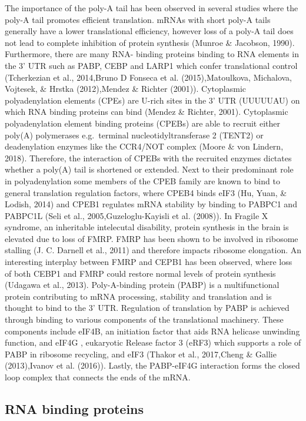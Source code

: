 \documentclass[12pt,openany]{book}
\begin{document}
The importance of the poly-A tail has been observed in several studies
where the poly-A tail promotes efficient translation. mRNAs with short
poly-A tails generally have a lower translational efficiency, however
loss of a poly-A tail does not lead to complete inhibition of protein
synthesis (Munroe \& Jacobson, 1990). Furthermore, there are many RNA-
binding proteins binding to RNA elements in the 3' UTR such as PABP,
CEBP and LARP1 which confer translational control (Tcherkezian et al.,
2014,Bruno D Fonseca et al. (2015),Matoulkova, Michalova, Vojtesek, \&
Hrstka (2012),Mendez \& Richter (2001)). Cytoplasmic polyadenylation
elements (CPEs) are U-rich sites in the 3' UTR (UUUUUAU) on which RNA
binding proteins can bind (Mendez \& Richter, 2001). Cytoplasmic
polyadenylation element binding proteins (CPEBs) are able to recruit
either poly(A) polymerases e.g.~terminal nucleotidyltransferase 2
(TENT2) or deadenylation enzymes like the CCR4/NOT complex (Moore \& von
Lindern, 2018). Therefore, the interaction of CPEBs with the recruited
enzymes dictates whether a poly(A) tail is shortened or extended. Next
to their predominant role in polyadenylation some members of the CPEB
family are known to bind to general translation regulation factors,
where CPEB4 binds eIF3 (Hu, Yuan, \& Lodish, 2014) and CPEB1 regulates
mRNA stability by binding to PABPC1 and PABPC1L (Seli et al.,
2005,Guzeloglu-Kayisli et al. (2008)). In Fragile X syndrome, an
inheritable intelecutal disability, protein synthesis in the brain is
elevated due to loss of FMRP. FMRP has been shown to be involved in
ribosome stalling (J. C. Darnell et al., 2011) and therefore impacts
ribosome elongation. An interesting interplay between FMRP and CEPB1 has
been observed, where loss of both CEBP1 and FMRP could restore normal
levels of protein synthesis (Udagawa et al., 2013). Poly-A-binding
protein (PABP) is a multifunctional protein contributing to mRNA
processing, stability and translation and is thought to bind to the 3'
UTR. Regulation of translation by PABP is achieved through binding to
various components of the translational machinery. These components
include eIF4B, an initiation factor that aids RNA helicase unwinding
function, and eIF4G , eukaryotic Release factor 3 (eRF3) which supports
a role of PABP in ribosome recycling, and eIF3 (Thakor et al.,
2017,Cheng \& Gallie (2013),Ivanov et al. (2016)). Lastly, the
PABP-eIF4G interaction forms the closed loop complex that connects the
ends of the mRNA. \subsection{RNA binding proteins}
\end{document}
